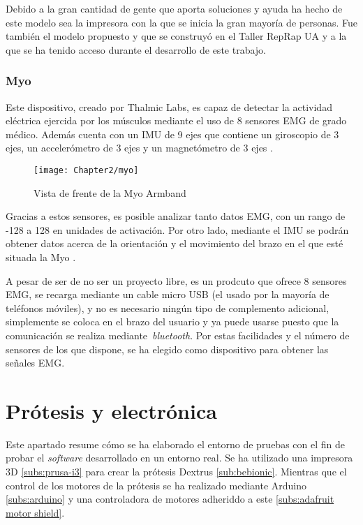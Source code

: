 Debido a la gran cantidad de gente que aporta soluciones y ayuda ha hecho de este
modelo sea la impresora con la que se inicia la gran mayoría de personas. Fue
también el modelo propuesto y que se construyó en el Taller RepRap UA
\cite{TallerRepRap} y a la que se ha tenido acceso durante el desarrollo de
este trabajo.

\subsubsection{Myo}
\label{subs:myo}


Este dispositivo, creado por Thalmic Labs, es capaz de detectar la actividad
eléctrica ejercida por los músculos mediante el uso de 8 sensores EMG de grado
médico. Además cuenta con un IMU de 9 ejes que contiene un giroscopio de 3
ejes, un accelerómetro de 3 ejes y un magnetómetro de 3 ejes \cite{myo-specs}.


\begin{figure}[htp]
  \centering
    \texttt{[image: Chapter2/myo]}
  \caption{Vista de frente de la Myo Armband}
\label{fig:myo}
\end{figure}

Gracias a estos sensores, es posible analizar tanto datos EMG, con un rango de
-128 a 128 en unidades de activación. Por otro lado, mediante el IMU se podrán
obtener datos acerca de la orientación y el movimiento del brazo en el que esté
situada la Myo \cite{abduo2015myo}.

A pesar de ser de no ser un proyecto libre, es un prodcuto que ofrece 8 sensores
EMG, se recarga mediante un cable micro USB (el usado por la mayoría de teléfonos
móviles), y no es necesario ningún tipo de complemento adicional, simplemente
se coloca en el brazo del usuario y ya puede usarse puesto que la comunicación
se realiza mediante~\textit{bluetooth}. Por estas facilidades y el número de
sensores de los que dispone, se ha elegido como dispositivo para obtener las
señales EMG.





%
%
%
%


\section{Prótesis y electrónica}
\label{sec:prótesis-electrónica}
Este apartado resume cómo se ha elaborado el entorno de pruebas con el fin de probar el \textit{software} desarrollado en un entorno real. Se ha utilizado una impresora 3D \ref{subs:prusa-i3} para crear la prótesis Dextrus \ref{sub:bebionic}. Mientras que el control de los motores de la prótesis se ha realizado mediante Arduino \ref{subs:arduino} y una controladora de motores adheriddo a este \ref{subs:adafruit motor shield}.


